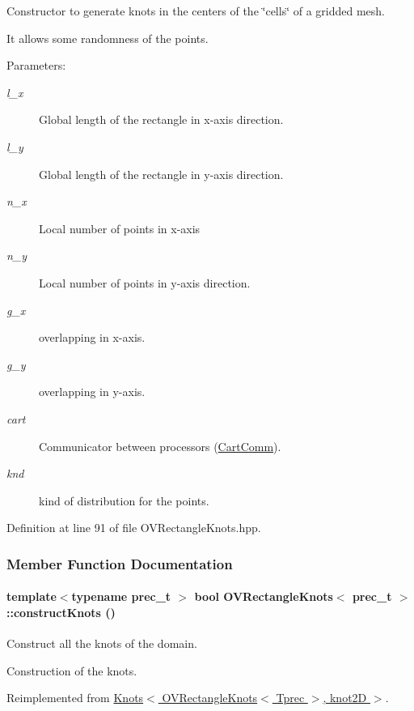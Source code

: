Constructor to generate knots in the centers of the \char`\"{}cells\char`\"{} of a gridded mesh. 

It allows some randomness of the points. \begin{Desc}
\item[Parameters:]
\begin{description}
\item[{\em l\_\-x}]Global length of the rectangle in x-axis direction. \item[{\em l\_\-y}]Global length of the rectangle in y-axis direction. \item[{\em n\_\-x}]Local number of points in x-axis \item[{\em n\_\-y}]Local number of points in y-axis direction. \item[{\em g\_\-x}]overlapping in x-axis. \item[{\em g\_\-y}]overlapping in y-axis. \item[{\em cart}]Communicator between processors (\hyperlink{classCartComm}{CartComm}). \item[{\em knd}]kind of distribution for the points. \end{description}
\end{Desc}


Definition at line 91 of file OVRectangleKnots.hpp.

\subsubsection{Member Function Documentation}
\hypertarget{classOVRectangleKnots_57cd6386ac15fafdbcd2475c44f4397a}{
\paragraph[{constructKnots}]{\setlength{\rightskip}{0pt plus 5cm}template$<$typename prec\_\-t $>$ bool {\bf OVRectangleKnots}$<$ prec\_\-t $>$::constructKnots ()}\hfill}
\label{classOVRectangleKnots_57cd6386ac15fafdbcd2475c44f4397a}


Construct all the knots of the domain. 

Construction of the knots. 

Reimplemented from \hyperlink{classKnots_8e622932aee837d4c3465093f3158ebb}{Knots$<$ OVRectangleKnots$<$ Tprec $>$, knot2D $>$}.

